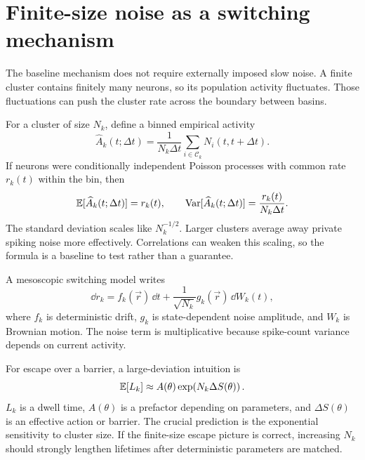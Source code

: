 \section{Finite-size noise as a switching mechanism}
\label{sec:finite-size-noise-switching-mechanism}

The baseline mechanism does not require externally imposed slow noise. A finite cluster contains finitely many neurons, so its population activity fluctuates. Those fluctuations can push the cluster rate across the boundary between basins.

For a cluster of size $N_k$, define a binned empirical activity
%
\begin{equation}
  \widehat A_k(t;\Delta t)
  =
  \frac{1}{N_k\Delta t}
  \sum_{i\in\mathcal{C}_k}
  N_i(t,t+\Delta t).
  \label{eq:cluster-binned-activity}
\end{equation}
%
If neurons were conditionally independent Poisson processes with common rate $r_k(t)$ within the bin, then
%
\begin{equation}
  \mathbb{E}[\widehat A_k(t;\Delta t)]=r_k(t),
  \qquad
  \operatorname{Var}[\widehat A_k(t;\Delta t)]
  =
  \frac{r_k(t)}{N_k\Delta t}.
  \label{eq:cluster-activity-finite-size-variance}
\end{equation}
%
The standard deviation scales like $N_k^{-1/2}$. Larger clusters average away private spiking noise more effectively. Correlations can weaken this scaling, so the formula is a baseline to test rather than a guarantee.

A mesoscopic switching model writes
%
\begin{equation}
  \dd r_k
  =
  f_k(\vec r)\,\dd t
  +
  \frac{1}{\sqrt{N_k}}g_k(\vec r)\,\dd W_k(t),
  \label{eq:cluster-finite-size-langevin}
\end{equation}
%
where $f_k$ is deterministic drift, $g_k$ is state-dependent noise amplitude, and $W_k$ is Brownian motion. The noise term is multiplicative because spike-count variance depends on current activity.

For escape over a barrier, a large-deviation intuition is
%
\begin{equation}
  \mathbb{E}[L_k]
  \approx
  A(\theta)\exp\!\left(N_k\Delta S(\theta)\right).
  \label{eq:cluster-dwell-large-deviation}
\end{equation}
%
$L_k$ is a dwell time, $A(\theta)$ is a prefactor depending on parameters, and $\Delta S(\theta)$ is an effective action or barrier. The crucial prediction is the exponential sensitivity to cluster size. If the finite-size escape picture is correct, increasing $N_k$ should strongly lengthen lifetimes after deterministic parameters are matched.

